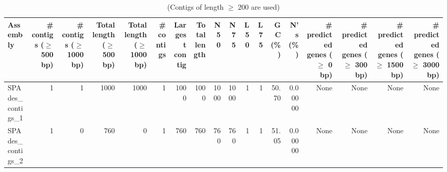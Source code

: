 \begin{table}[ht]
\begin{center}
\caption{(Contigs of length $\geq$ 200 are used)}
\begin{tabular}{|l*{17}{|r}|}
\hline
Assembly & \# contigs ($\geq$ 500 bp) & \# contigs ($\geq$ 1000 bp) & Total length ($\geq$ 500 bp) & Total length ($\geq$ 1000 bp) & \# contigs & Largest contig & Total length & N50 & N75 & L50 & L75 & GC (\%) & N's (\%) & \# predicted genes ($\geq$ 0 bp) & \# predicted genes ($\geq$ 300 bp) & \# predicted genes ($\geq$ 1500 bp) & \# predicted genes ($\geq$ 3000 bp) \\ \hline
SPAdes\_contigs\_1 & 1 & 1 & 1000 & 1000 & 1 & 1000 & 1000 & 1000 & 1000 & 1 & 1 & 50.70 & 0.00000 & None & None & None & None \\ \hline
SPAdes\_contigs\_2 & 1 & 0 & 760 & 0 & 1 & 760 & 760 & 760 & 760 & 1 & 1 & 51.05 & 0.00000 & None & None & None & None \\ \hline
\end{tabular}
\end{center}
\end{table}
